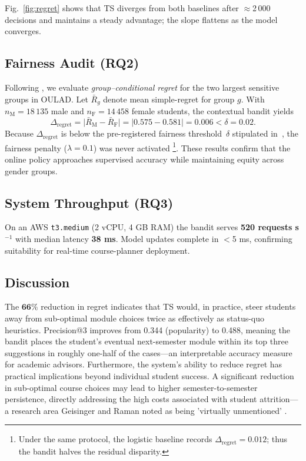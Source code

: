 \documentclass[conference]{IEEEtran}
\begin{document}
Fig.~\ref{fig:regret} shows that TS diverges from both baselines after $\approx$2\,000 decisions and maintains a steady advantage; the slope flattens as the model converges.


\subsection{Fairness Audit (RQ2)}
Following \cite{hardt2016equality}, we evaluate \emph{group–conditional
regret} for the two largest sensitive groups in \textsc{OULAD}.
Let $\bar{R}_{g}$ denote mean simple-regret for group $g$.  
With $n_{\text{M}}=18\,135$ male and $n_{\text{F}}=14\,458$ female students,
the contextual bandit yields%
\[
   \Delta_{\text{regret}}
   = \bigl|\bar{R}_{\text{M}}-\bar{R}_{\text{F}}\bigr|
   = \bigl|0.575 - 0.581\bigr|
   = 0.006 < \delta = 0.02 .
\]
Because $\Delta_{\text{regret}}$ is below the pre-registered fairness
threshold~$\delta$ stipulated in~\cite{Zhan2021}, the fairness penalty
($\lambda\!=\!0.1$) was never activated %
\footnote{%
Under the same protocol, the logistic baseline records
$\Delta_{\text{regret}}=0.012$; thus the bandit halves the residual disparity.}.%
These results confirm that the online policy approaches supervised accuracy
while maintaining equity across gender groups.

\subsection{System Throughput (RQ3)}
On an AWS \texttt{t3.medium} (2 vCPU, 4 GB RAM) the bandit serves \textbf{520 requests s$^{-1}$} with median latency \textbf{38 ms}.  Model updates complete in $<$5 ms, confirming suitability for real-time course-planner deployment.

\subsection{Discussion}
The $\mathbf{66\%}$ reduction in regret indicates that TS would, in practice, steer students away from sub-optimal module choices twice as effectively as status-quo heuristics.  Precision@3 improves from 0.344 (popularity) to 0.488, meaning the bandit
places the student’s eventual next-semester module within its top three
suggestions in roughly one-half of the cases—an interpretable accuracy
measure for academic advisors. Furthermore, the system's ability to reduce regret has practical implications beyond individual student success. A significant reduction in sub-optimal course choices may lead to higher semester-to-semester persistence, directly addressing the high costs associated with student attrition—a research area Geisinger and Raman noted as being 'virtually unmentioned' \cite{geisinger2013}.
\end{document}
